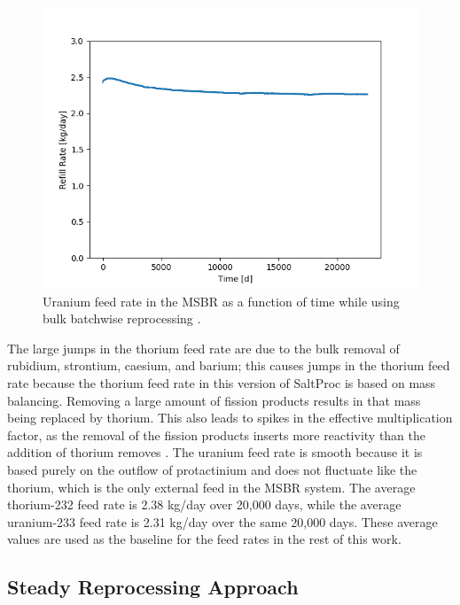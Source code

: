 \begin{figure}[H]
  \centering
  \includegraphics[scale=0.75]{images/Pa233rem_massv01.png}
  \caption{Uranium feed rate in the MSBR as a function of time while using bulk batchwise reprocessing \cite{rykhlevskii_advanced_2018}.}
   \label{fig:U-feed-v1}
\end{figure}

The large jumps in the thorium feed rate are due to the bulk removal of rubidium, strontium, caesium, and barium; this causes jumps in the thorium feed rate because the thorium feed rate in this version of SaltProc is based on mass balancing.
Removing a large amount of fission products results in that mass being replaced by thorium.
This also leads to spikes in the effective multiplication factor, as the removal of the fission products inserts more reactivity than the addition of thorium removes \cite{rykhlevskii_advanced_2018}. The uranium feed rate is smooth because it is based purely on the outflow of protactinium and does not fluctuate like the thorium, which is the only external feed in the MSBR system. The average thorium-232 feed rate is 2.38 kg/day over 20,000 days, while the average uranium-233 feed rate is 2.31 kg/day over the same 20,000 days. These average values are used as the baseline for the feed rates in the rest of this work.

\subsection{Steady Reprocessing Approach}
\label{s:steady}

